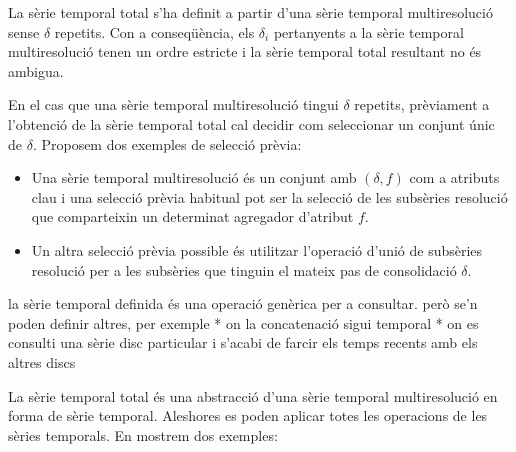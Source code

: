 La sèrie temporal total s'ha definit a partir d'una sèrie temporal
multiresolució sense $\delta$ repetits. Con a conseqüència, els
$\delta_i$ pertanyents a la sèrie temporal multiresolució tenen un
ordre estricte i la sèrie temporal total resultant no és ambigua.

En el cas que una sèrie temporal multiresolució tingui $\delta$
repetits, prèviament a l'obtenció de la sèrie temporal total cal
decidir com seleccionar un conjunt únic de $\delta$. Proposem dos
exemples de selecció prèvia:
\begin{itemize}
\item Una sèrie temporal multiresolució és un conjunt amb $(\delta,f)$
  com a atributs clau i una selecció prèvia habitual pot ser la
  selecció de les subsèries resolució que comparteixin un determinat
  agregador d'atribut $f$.
\item Un altra selecció prèvia possible és utilitzar l'operació d'unió
  de subsèries resolució per a les subsèries que tinguin el mateix pas
  de consolidació $\delta$.
\end{itemize}


\todo{}
la sèrie temporal definida és una operació genèrica per a consultar. però se'n poden definir altres, per exemple
* on la concatenació sigui temporal
* on es consulti una sèrie disc particular i s'acabi de farcir els temps recents amb els altres discs






La sèrie temporal total és una abstracció d'una sèrie temporal
multiresolució en forma de sèrie temporal. Aleshores es poden aplicar
totes les operacions de les sèries temporals. En mostrem dos exemples:

